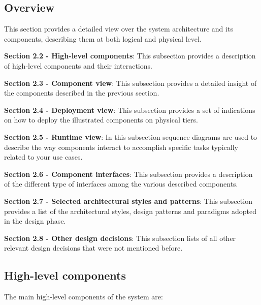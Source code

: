 
%

\subsection{Overview}
This section provides a detailed view over the system architecture and its components, describing them at both logical and physical level. \newline

\textbf{Section 2.2 - High-level components}: This subsection provides a description of high-level components and their interactions. \newline

\textbf{Section 2.3 - Component view}: This subsection provides a detailed insight of the components described in the previous section. \newline

\textbf{Section 2.4 - Deployment view}: This subsection provides a set of indications on how to deploy the illustrated components on physical tiers. \newline

\textbf{Section 2.5 - Runtime view}: In this subsection sequence diagrams are used to describe the way components interact to accomplish specific tasks typically related to your use cases. \newline

\textbf{Section 2.6 - Component interfaces}: This subsection provides a description of the different type of interfaces among the various described components. \newline

\textbf{Section 2.7 - Selected architectural styles and patterns}: This subsection provides a list of the architectural styles, design patterns and paradigms adopted in the design phase. \newline

\textbf{Section 2.8 - Other design decisions}: This subsection lists of all other relevant design decisions that were not mentioned before.

\clearpage

\subsection{High-level components}
The main high-level components of the system are:

